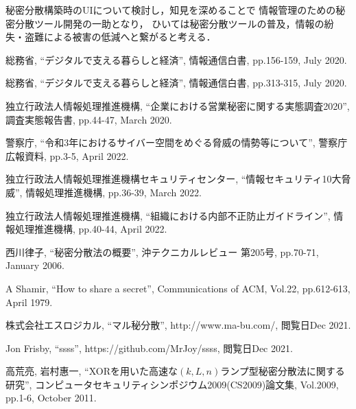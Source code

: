\documentclass[fleqn, uplatex]{jsarticle}
\begin{document}
秘密分散構築時のUIについて検討し，知見を深めることで%
情報管理のための秘密分散ツール開発の一助となり，%
ひいては秘密分散ツールの普及，情報の紛失・盗難による被害の低減へと繋がると考える．

\begin{thebibliography}{9}
	\footnotesize
		総務省, 
		``デジタルで支える暮らしと経済'', 
		情報通信白書, pp.156-159, July 2020.

		総務省, 
		``デジタルで支える暮らしと経済'', 
		情報通信白書, pp.313-315, July 2020.

		独立行政法人情報処理推進機構, 
		``企業における営業秘密に関する実態調査2020'', 
		調査実態報告書, pp.44-47, March 2020.
	
		警察庁, 
		``令和3年におけるサイバー空間をめぐる脅威の情勢等について'', 
		警察庁 広報資料, pp.3-5, April 2022.
	
		独立行政法人情報処理推進機構セキュリティセンター, 
		``情報セキュリティ10大脅威'', 
		情報処理推進機構, pp.36-39, March 2022.

		独立行政法人情報処理推進機構, 
		``組織における内部不正防止ガイドライン'', 
		情報処理推進機構, pp.40-44, April 2022.
	
		西川律子,
		``秘密分散法の概要'', 
		沖テクニカルレビュー 第205号, pp.70-71, January 2006.
	
		A Shamir, 
		``How to share a secret'', 
		Communications of ACM, Vol.22, pp.612-613, April 1979.
	
		株式会社エスロジカル, 
		``マル秘分散'', 
		http://www.ma-bu.com/, 
		閲覧日Dec 2021.
	
		Jon Frisby, 
		``ssss'', 
		https://github.com/MrJoy/ssss, 
		閲覧日Dec 2021.

		高荒亮, 岩村惠一, 
		``XORを用いた高速な$(k,L,n)$ランプ型秘密分散法に関する研究'', 
		コンピュータセキュリティシンポジウム2009(CS2009)論文集, Vol.2009, pp.1-6, October 2011.
	
%
\end{thebibliography}
\end{document}

